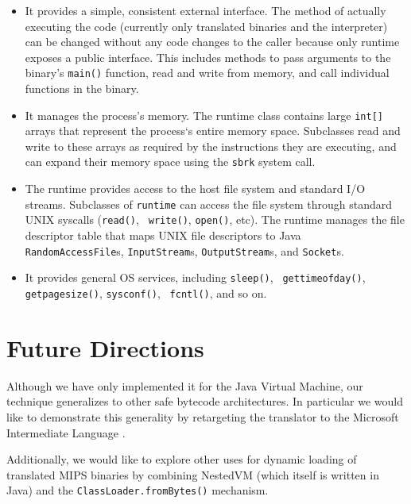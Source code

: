 \documentclass{acmconf}
\begin{document}
\begin{itemize}
      
\item It provides a simple, consistent external interface.  The method
      of actually executing the code (currently only translated
      binaries and the interpreter) can be changed without any code
      changes to the caller because only runtime exposes a public
      interface.  This includes methods to pass arguments to the
      binary's {\tt main()} function, read and write from memory, and
      call individual functions in the binary.
      
\item It manages the process's memory.  The runtime class contains
      large {\tt int[]} arrays that represent the process`s entire
      memory space.  Subclasses read and write to these arrays as
      required by the instructions they are executing, and can expand
      their memory space using the {\tt sbrk} system call.
      
\item The runtime provides access to the host file system and standard
      I/O streams.  Subclasses of {\tt runtime} can access the file
      system through standard UNIX syscalls ({\tt read()}, {\tt
      write()}, {\tt open()}, etc).  The runtime manages the file
      descriptor table that maps UNIX file descriptors to Java {\tt
      RandomAccessFile}s, {\tt InputStream}s, {\tt OutputStream}s, and
      {\tt Socket}s.
      
\item It provides general OS services, including {\tt sleep()}, {\tt
      gettimeofday()}, {\tt getpagesize()}, {\tt sysconf()}, {\tt
      fcntl()}, and so on.
      
\end{itemize}

\section{Future Directions}

Although we have only implemented it for the Java Virtual Machine, our
technique generalizes to other safe bytecode architectures.  In
particular we would like to demonstrate this generality by retargeting
the translator to the Microsoft Intermediate Language \cite{msil}.

Additionally, we would like to explore other uses for dynamic loading
of translated MIPS binaries by combining NestedVM (which itself is
written in Java) and the {\tt ClassLoader.fromBytes()} mechanism.
\end{document}
